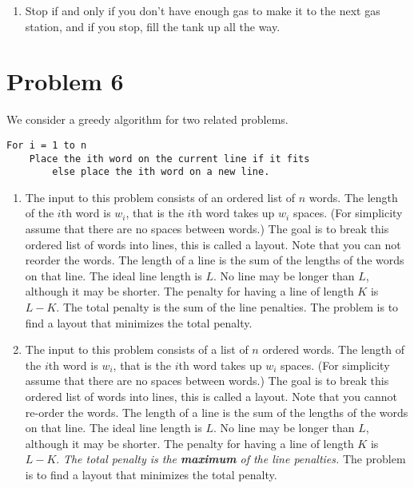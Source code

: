 \documentclass{article}
\providecommand{\prob}[1]{\section*{Problem #1}}
\begin{document}
\begin{enumerate}[label=(\alph*)]
\begin{proof}
            The only difference between the two is the $Opt'(I)$ agrees with $FAYG(I)$ for one more step than does $Opt(I)$.
            This is a contradiction on the maximal agreement between $Opt$ and $FAYG$.
            For this reason, $FAYG$ is optimal.
            
        \end{proof}
        
        
        \item Stop if and only if you don't have enough gas to make it to the next gas station, and if you stop, fill the tank up all the way.
    \end{enumerate}
    

    \prob{6}
    We consider a greedy algorithm for two related problems.
    
    \begin{lstlisting}
For i = 1 to n
    Place the ith word on the current line if it fits
        else place the ith word on a new line.
    \end{lstlisting}
    
    \begin{enumerate}[label=(\alph*)]
        \item The input to this problem consists of an ordered list of $n$ words. 
        The length of the $i$th word is $w_i$, that is the $i$th word takes up $w_i$ spaces. 
        (For simplicity assume that there are no spaces between words.)
        The goal is to break this ordered list of words into lines, this is called a layout. 
        Note that you can not reorder the words. 
        The length of a line is the sum of the lengths of the words on that line. 
        The ideal line length is $L$. 
        No line may be longer than $L$, although it may be shorter. 
        The penalty for having a line of length $K$ is $L − K$. 
        The total penalty is the sum of the line penalties.
        The problem is to find a layout that minimizes the total penalty.
        
        
        \item The input to this problem consists of a list of $n$ ordered words.
        The length of the $i$th word is $w_i$, that is the $i$th word takes up $w_i$ spaces.
        (For simplicity assume that there are no spaces between words.)
        The goal is to break this ordered list of words into lines, this is called a layout.
        Note that you cannot re-order the words.
        The length of a line is the sum of the lengths of the words on that line.
        The ideal line length is $L$.
        No line may be longer than $L$, although it may be shorter.
        The penalty for having a line of length $K$ is $L - K$.
        \emph{The total penalty is the \textbf{maximum} of the line penalties.}
        The problem is to find a layout that minimizes the total penalty.
        
        
    \end{enumerate}
\end{document}

